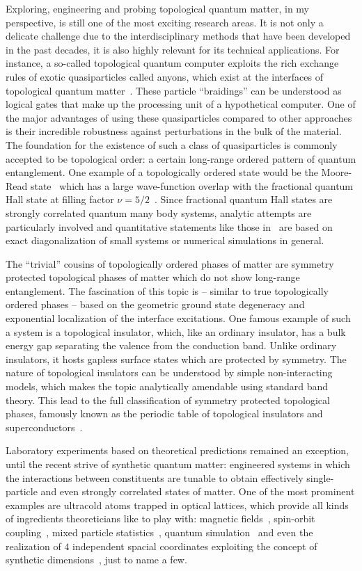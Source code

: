 Exploring, engineering and probing topological quantum matter, in my perspective, is still one of the most exciting research areas.
It is not only a delicate challenge due to the interdisciplinary methods that have been developed in the past decades, it is also highly relevant for its technical applications.
For instance, a so-called topological quantum computer exploits the rich exchange rules of exotic quasiparticles called anyons, which exist at the interfaces of topological quantum matter~\cite{Freedman2002}.
These particle ``braidings'' can be understood as logical gates that make up the processing unit of a hypothetical computer.
One of the major advantages of using these quasiparticles compared to other approaches is their incredible robustness against perturbations in the bulk of the material.
The foundation for the existence of such a class of quasiparticles is commonly accepted to be topological order: a certain long-range ordered pattern of quantum entanglement.
One example of a topologically ordered state would be the Moore-Read state~\cite{Moore1991,Read1996} which has a large wave-function overlap with the fractional quantum Hall state at filling factor $\nu=5/2$~\cite{Storni2010}.
Since fractional quantum Hall states are strongly correlated quantum many body systems, analytic attempts are particularly involved and quantitative statements like those in~\cite{Storni2010} are based on exact diagonalization of small systems or numerical simulations in general.

The ``trivial'' cousins of topologically ordered phases of matter are symmetry protected topological phases of matter which do not show long-range entanglement.
The fascination of this topic is -- similar to true topologically ordered phases -- based on the geometric ground state degeneracy and exponential localization of the interface excitations.
One famous example of such a system is a topological insulator, which, like an ordinary insulator, has a bulk energy gap separating the valence from the conduction band.
Unlike ordinary insulators, it hosts gapless surface states which are protected by symmetry.
The nature of topological insulators can be understood by simple non-interacting models, which makes the topic analytically amendable using standard band theory.
This lead to the full classification of symmetry protected topological phases, famously known as the periodic table of topological insulators and superconductors~\cite{Altland1997,Kitaev2009}.

Laboratory experiments based on theoretical predictions remained an exception, until the recent strive of synthetic quantum matter:
engineered systems in which the interactions between constituents are tunable to obtain effectively single-particle and even strongly correlated states of matter.
One of the most prominent examples are ultracold atoms trapped in optical lattices, which provide all kinds of ingredients theoreticians like to play with: magnetic fields~\cite{Lin2009}, spin-orbit coupling~\cite{Lin2011}, mixed particle statistics~\cite{Ferrari2002}, quantum simulation~\cite{Mazza2012} and even the realization of $4$ independent spacial coordinates exploiting the concept of synthetic dimensions~\cite{Lohse2018}, just to name a few.
%
%
